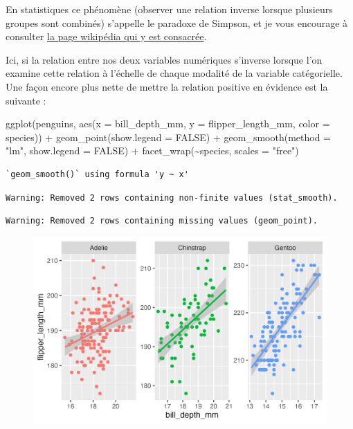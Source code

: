 \documentclass[
  letterpaper,
  DIV=11,
  numbers=noendperiod]{scrreprt}
\newenvironment{Shaded}{\begin{snugshade}}{\end{snugshade}}
\newcommand{\AttributeTok}[1]{\textcolor[rgb]{0.40,0.45,0.13}{#1}}
\newcommand{\ConstantTok}[1]{\textcolor[rgb]{0.56,0.35,0.01}{#1}}
\newcommand{\FunctionTok}[1]{\textcolor[rgb]{0.28,0.35,0.67}{#1}}
\newcommand{\NormalTok}[1]{\textcolor[rgb]{0.00,0.23,0.31}{#1}}
\newcommand{\SpecialCharTok}[1]{\textcolor[rgb]{0.37,0.37,0.37}{#1}}
\newcommand{\StringTok}[1]{\textcolor[rgb]{0.13,0.47,0.30}{#1}}
\begin{document}
En statistiques ce phénomène (observer une relation inverse lorsque
plusieurs groupes sont combinés) s'appelle le paradoxe de Simpson, et je
vous encourage à consulter
\href{https://fr.wikipedia.org/wiki/Paradoxe_de_Simpson}{la page
wikipédia qui y est consacrée}.

Ici, si la relation entre nos deux variables numériques s'inverse
lorsque l'on examine cette relation à l'échelle de chaque modalité de la
variable catégorielle. Une façon encore plus nette de mettre la relation
positive en évidence est la suivante :

\begin{Shaded}
\begin{Highlighting}[]
\FunctionTok{ggplot}\NormalTok{(penguins, }\FunctionTok{aes}\NormalTok{(}\AttributeTok{x =}\NormalTok{ bill\_depth\_mm, }\AttributeTok{y =}\NormalTok{ flipper\_length\_mm,}
                     \AttributeTok{color =}\NormalTok{ species)) }\SpecialCharTok{+}
  \FunctionTok{geom\_point}\NormalTok{(}\AttributeTok{show.legend =} \ConstantTok{FALSE}\NormalTok{) }\SpecialCharTok{+}
  \FunctionTok{geom\_smooth}\NormalTok{(}\AttributeTok{method =} \StringTok{"lm"}\NormalTok{, }\AttributeTok{show.legend =} \ConstantTok{FALSE}\NormalTok{) }\SpecialCharTok{+}
  \FunctionTok{facet\_wrap}\NormalTok{(}\SpecialCharTok{\textasciitilde{}}\NormalTok{species, }\AttributeTok{scales =} \StringTok{"free"}\NormalTok{)}
\end{Highlighting}
\end{Shaded}

\begin{verbatim}
`geom_smooth()` using formula 'y ~ x'
\end{verbatim}

\begin{verbatim}
Warning: Removed 2 rows containing non-finite values (stat_smooth).
\end{verbatim}

\begin{verbatim}
Warning: Removed 2 rows containing missing values (geom_point).
\end{verbatim}

\begin{figure}[H]

{\centering \includegraphics{./03-visualization_files/figure-pdf/unnamed-chunk-84-1.png}

}

\end{figure}
\end{document}

